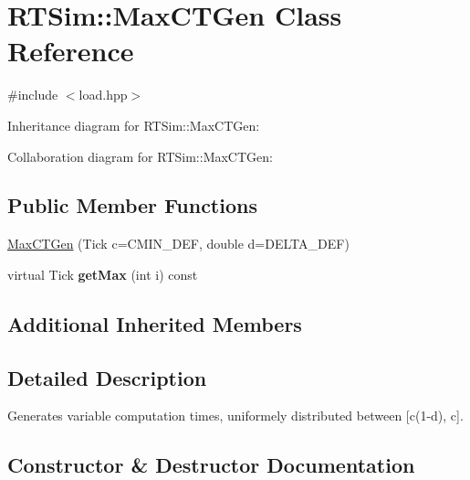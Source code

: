 \hypertarget{classRTSim_1_1MaxCTGen}{}\section{R\+T\+Sim\+:\+:Max\+C\+T\+Gen Class Reference}
\label{classRTSim_1_1MaxCTGen}


{\ttfamily \#include $<$load.\+hpp$>$}



Inheritance diagram for R\+T\+Sim\+:\+:Max\+C\+T\+Gen\+:


Collaboration diagram for R\+T\+Sim\+:\+:Max\+C\+T\+Gen\+:
\subsection*{Public Member Functions}
\begin{DoxyCompactItemize}
\item 
\hyperlink{classRTSim_1_1MaxCTGen_a20f70ef5bf575ba3d1171e7cf5dc395e}{Max\+C\+T\+Gen} (Tick c=C\+M\+I\+N\+\_\+\+D\+EF, double d=D\+E\+L\+T\+A\+\_\+\+D\+EF)
\item 
virtual Tick {\bfseries get\+Max} (int i) const \hypertarget{classRTSim_1_1MaxCTGen_ab325d8e8f9d66498a5f2626d83edc091}{}\label{classRTSim_1_1MaxCTGen_ab325d8e8f9d66498a5f2626d83edc091}

\end{DoxyCompactItemize}
\subsection*{Additional Inherited Members}


\subsection{Detailed Description}
Generates variable computation times, uniformely distributed between \mbox{[}c(1-\/d), c\mbox{]}. 

\subsection{Constructor \& Destructor Documentation}
